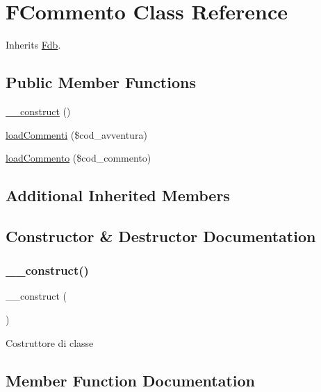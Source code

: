 \hypertarget{class_f_commento}{}\section{F\+Commento Class Reference}
\label{class_f_commento}


Inherits \mbox{\hyperlink{class_fdb}{Fdb}}.

\subsection*{Public Member Functions}
\begin{DoxyCompactItemize}
\item 
\mbox{\hyperlink{class_f_commento_a095c5d389db211932136b53f25f39685}{\+\_\+\+\_\+construct}} ()
\item 
\mbox{\hyperlink{class_f_commento_a65cb773599364a81de198c9b419eba69}{load\+Commenti}} (\$cod\+\_\+avventura)
\item 
\mbox{\hyperlink{class_f_commento_aad304f1e51e8522f6b69b74bffc35aec}{load\+Commento}} (\$cod\+\_\+commento)
\end{DoxyCompactItemize}
\subsection*{Additional Inherited Members}


\subsection{Constructor \& Destructor Documentation}
\mbox{\label{class_f_commento_a095c5d389db211932136b53f25f39685}} 
\subsubsection{\texorpdfstring{\+\_\+\+\_\+construct()}{\_\_construct()}}
{\footnotesize\ttfamily \+\_\+\+\_\+construct (\begin{DoxyParamCaption}{ }\end{DoxyParamCaption})}

Costruttore di classe 

\subsection{Member Function Documentation}
\mbox{\label{class_f_commento_a65cb773599364a81de198c9b419eba69}} 
